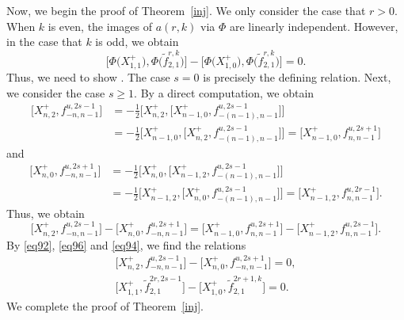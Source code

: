 \documentclass[pdftex]{sigma}
\numberwithin{equation}{section}
\theoremstyle{definition}
\begin{document}
Now, we begin the proof of Theorem~\ref{inj}. We only consider the case that $r>0$. When $k$ is even, the images of $a(r,k)$ via $\Phi$ are linearly independent. However, in the case that $k$ is odd, we obtain
\begin{equation*}
\bigl[\Phi\bigl(X^+_{1,1}\bigr),\Phi\bigl(\widetilde{f}_{2,1}^{r,k}\bigr)\bigr]-\bigl[\Phi\bigl(X^+_{1,0}\bigr),\Phi\bigl(\widetilde{f}_{2,1}^{r,k}\bigr)\bigr]=0.
\end{equation*}
Thus, we need to show .
The case $s=0$ is precisely the defining relation.
Next, we consider the case $s\geq1$. By a direct computation, we obtain
\begin{align*}
\bigl[X^+_{n,2},f_{-n,n-1}^{u,2s-1}\bigr]&=-\frac{1}{2}\bigl[X^+_{n,2},\bigl[X^+_{n-1,0},f_{-(n-1),n-1}^{u,2s-1}\bigr]\bigr]\\
&=-\frac{1}{2}\bigl[X^+_{n-1,0},\bigl[X^+_{n,2},f_{-(n-1),n-1}^{u,2s-1}\bigr]\bigr]=\bigl[X^+_{n-1,0},f_{n,n-1}^{u,2s+1}\bigr]
\end{align*}
and
\begin{align*}
\bigl[X^+_{n,0},f_{-n,n-1}^{u,2s+1}\bigr]&=-\frac{1}{2}\bigl[X^+_{n,0},\bigl[X^+_{n-1,2},f_{-(n-1),n-1}^{u,2s-1}\bigr]\bigr]\\
&=-\frac{1}{2}\bigl[X^+_{n-1,2},\bigl[X^+_{n,0},f_{-(n-1),n-1}^{u,2s-1}\bigr]\bigr]=\bigl[X^+_{n-1,2},f_{n,n-1}^{u,2r-1}\bigr].
\end{align*}
Thus, we obtain
\begin{equation}
\bigl[X^+_{n,2},f_{-n,n-1}^{u,2s-1}\bigr]-\bigl[X^+_{n,0},f_{-n,n-1}^{u,2s+1}\bigr]=\bigl[X^+_{n-1,0},f_{n,n-1}^{u,2s+1}\bigr]-\bigl[X^+_{n-1,2},f_{n,n-1}^{u,2s-1}\bigr].\label{eq96}
\end{equation}
By \eqref{eq92}, \eqref{eq96} and \eqref{eq94}, we find the relations
\begin{gather*}
\bigl[X^+_{n,2},f_{-n,n-1}^{u,2s-1}\bigr]-\bigl[X^+_{n,0},f_{-n,n-1}^{u,2s+1}\bigr]=0,\\
\bigl[X^+_{1,1},\widetilde{f}_{2,1}^{2r,2s-1}\bigr]-\bigl[X^+_{1,0},\widetilde{f}_{2,1}^{2r+1,k}\bigr]=0.
\end{gather*}
We complete the proof of Theorem~\ref{inj}.
\end{document}
